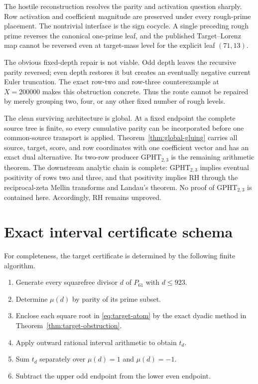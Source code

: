 \documentclass[11pt]{article}
\newcommand{\1}{\mathbf 1}
\newcommand{\GPHT}{\mathrm{GPHT}_{2,3}}
\begin{document}
The hostile reconstruction resolves the parity and activation question sharply.
Row activation and coefficient magnitude are preserved under every rough-prime
placement.  The nontrivial interface is the sign cocycle.  A single preceding
rough prime reverses the canonical one-prime leaf, and the published
Target--Lorenz map cannot be reversed even at target-mass level for the explicit
leaf $(71,13)$.

The obvious fixed-depth repair is not viable.  Odd depth leaves the recursive
parity reversed; even depth restores it but creates an eventually negative
current Euler truncation.  The exact row-two and row-three counterexample at
$X=200000$ makes this obstruction concrete.  Thus the route cannot be repaired
by merely grouping two, four, or any other fixed number of rough levels.

The clean surviving architecture is global.  At a fixed endpoint the complete
source tree is finite, so every cumulative parity can be incorporated before
one common-source transport is applied.  Theorem~\ref{thm:global-gluing} carries
all source, target, score, and row coordinates with one coefficient vector and
has an exact dual alternative.  Its two-row producer $\GPHT$ is the remaining
arithmetic theorem.  The downstream analytic chain is complete:
$\GPHT$ implies eventual positivity of rows two and three, and that positivity
implies RH through the reciprocal-zeta Mellin transforms and Landau's theorem.
No proof of $\GPHT$ is contained here.  Accordingly, RH remains unproved.

\appendix
\section{Exact interval certificate schema}

For completeness, the target certificate is determined by the following finite
algorithm.

\begin{enumerate}[label=(\roman*)]
\item Generate every squarefree divisor $d$ of $P_{61}$ with $d\le923$.
\item Determine $\mu(d)$ by parity of its prime subset.
\item Enclose each square root in \eqref{eq:target-atom} by the exact dyadic
method in Theorem~\ref{thm:target-obstruction}.
\item Apply outward rational interval arithmetic to obtain $t_d$.
\item Sum $t_d$ separately over $\mu(d)=1$ and $\mu(d)=-1$.
\item Subtract the upper odd endpoint from the lower even endpoint.
\end{enumerate}
\end{document}
